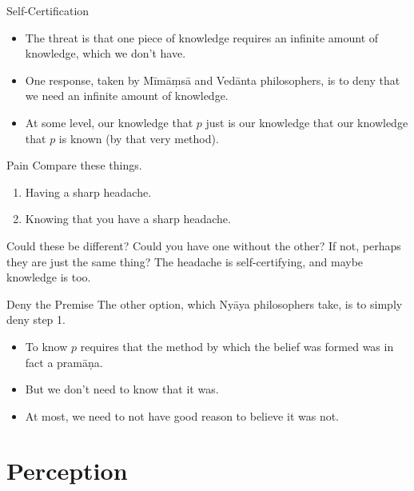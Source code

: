 \documentclass[
  17pt,
  letterpaper,
  ignorenonframetext,
  aspectratio=169,
]{beamer}
\providecommand{\tightlist}{%
  \setlength{\itemsep}{0pt}\setlength{\parskip}{0pt}}\usepackage{longtable,booktabs,array}
\begin{document}
\begin{frame}{Self-Certification}
\protect\hypertarget{self-certification}{}
\begin{itemize}[<+->]
\tightlist
\item
  The threat is that one piece of knowledge requires an infinite amount
  of knowledge, which we don't have.
\item
  One response, taken by Mīmāṃsā and Vedānta philosophers, is to deny
  that we need an infinite amount of knowledge.
\item
  At some level, our knowledge that \(p\) just is our knowledge that our
  knowledge that \(p\) is known (by that very method).
\end{itemize}
\end{frame}

\begin{frame}{Pain}
\protect\hypertarget{pain}{}
Compare these things.

\begin{enumerate}[<+->]
\tightlist
\item
  Having a sharp headache.
\item
  Knowing that you have a sharp headache.
\end{enumerate}

\pause Could these be different? Could you have one without the other?
If not, perhaps they are just the same thing? The headache is
self-certifying, and maybe knowledge is too.
\end{frame}

\begin{frame}{Deny the Premise}
\protect\hypertarget{deny-the-premise}{}
The other option, which Nyāya philosophers take, is to simply deny step
1.

\begin{itemize}[<+->]
\tightlist
\item
  To know \(p\) requires that the method by which the belief was formed
  was in fact a pramāṇa.
\item
  But we don't need to know that it was.
\item
  At most, we need to not have good reason to believe it was not.
\end{itemize}
\end{frame}

\hypertarget{perception}{%
\section{Perception}\label{perception}}
\end{document}
